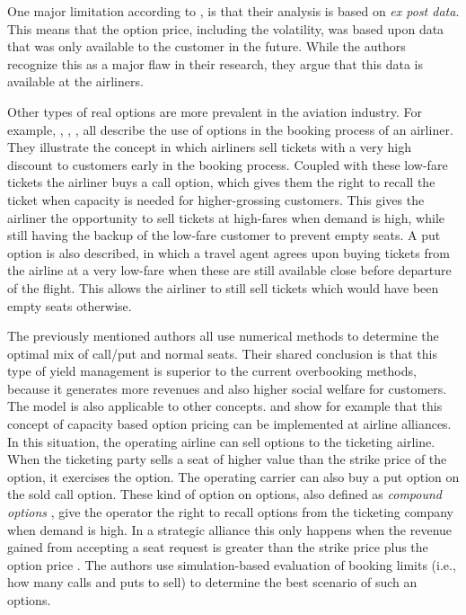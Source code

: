 One major limitation according to , is that their analysis is based on \emph{ex post data}. This means that the option price, including the volatility, was based upon data that was only available to the customer in the future. While the authors recognize this as a major flaw in their research, they argue that this data is available at the airliners.

Other types of real options are more prevalent in the aviation industry. For example, , , , all describe the use of options in the booking process of an airliner. They illustrate the concept in which airliners sell tickets with a very high discount to customers early in the booking process. Coupled with these low-fare tickets the airliner buys a call option, which gives them the right to recall the ticket when capacity is needed for higher-grossing customers. This gives the airliner the opportunity to sell tickets at high-fares when demand is high, while still having the backup of the low-fare customer to prevent empty seats. A put option is also described, in which a travel agent agrees upon buying tickets from the airline at a very low-fare when these are still available close before departure of the flight. This allows the airliner to still sell tickets which would have been empty seats otherwise.

The previously mentioned authors all use numerical methods to determine the optimal mix of call/put and normal seats. Their shared conclusion is that this type of yield management is superior to the current overbooking methods, because it generates more revenues and also higher social welfare for customers. The model is also applicable to other concepts.  and  show for example that this concept of capacity based option pricing can be implemented at airline alliances. In this situation, the operating airline can sell options to the ticketing airline. When the ticketing party sells a seat of higher value than the strike price of the option, it exercises the option. The operating carrier can also buy a put option on the sold call option. These kind of option on options, also defined as \emph{compound options} \cite{trigeorgis1996real}, give the operator the right to recall options from the ticketing company when demand is high. In a strategic alliance this only happens when the revenue gained from accepting a seat request is greater than the strike price plus the option price . The authors use simulation-based evaluation of booking limits (i.e., how many calls and puts to sell) to determine the best scenario of such an options.

